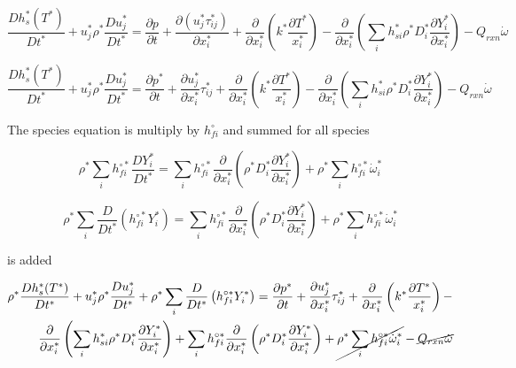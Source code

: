 \begin{equation*}
\frac{D h_{s}^*(T^*)}{D t^*}
+
u_j^*
\rho^*
\frac{D u_j^*}{D t^*}
=
\frac{\partial p}{\partial t} 
+
\frac{\partial (u_j^*\tau_{ij}^*)}{\partial x^*_i}
+
\frac{\partial}{\partial x_i^*}
\left(
    k^*\frac{\partial T^*}{x_i^*}
\right)
-
\frac{\partial}{\partial x_i^*}
\left(
        \sum_i
        h_{si}^*
        \rho^*
        D_i^*
        \frac{\partial Y_i^*}{\partial x_i^*}
\right)
-
Q_{rxn}
\dot{\omega}
\end{equation*} 

\begin{equation*}
\frac{D h_{s}^*(T^*)}{D t^*}
+
u_j^*
\rho^*
\frac{D u_j^*}{D t^*}
=
\frac{\partial p^*}{\partial t} 
+
\frac{\partial u_j^*}{\partial x^*_i}
\tau_{ij}^*
+
\frac{\partial}{\partial x_i^*}
\left(
    k^*\frac{\partial T^*}{x_i^*}
\right)
-
\frac{\partial}{\partial x_i^*}
\left(
        \sum_i
        h_{si}^*
        \rho^*
        D_i^*
        \frac{\partial Y_i^*}{\partial x_i^*}
\right)
-
Q_{rxn}
\dot{\omega}
\end{equation*} 


The species equation is multiply by $h_{fi}^{\circ}$ and summed 
for all species 

\begin{equation}
    \rho^*
    \sum_i  
    h_{fi}^{\circ*}
    \frac{D Y_i^*}{D t^*}
    =
    \sum_i  
    h_{fi}^{\circ*}
    \frac{\partial }{\partial x_i^*}
    \left(
        \rho^*D_i^*
        \frac{\partial Y_i^* }{\partial x_i^*}
    \right)
    +
    \rho^*
    \sum_i
    h_{fi}^{\circ*}
    \dot{\omega}_i^{*}
\end{equation}

\begin{equation}
    \rho^*
    \sum_i  
    \frac{D }{D t^*}
    \left(
        h_{fi}^{\circ*}
        Y_i^*
    \right)
    =
    \sum_i  
    h_{fi}^{\circ*}
    \frac{\partial }{\partial x_i^*}
    \left(
        \rho^*D_i^*
        \frac{\partial Y_i^* }{\partial x_i^*}
    \right)
    +
    \rho^*
    \sum_i
    h_{fi}^{\circ*}
    \dot{\omega}_i^{*}
\end{equation}

is added 

\begin{equation*}
\begin{split}
\rho^*
\frac{D h_{s}^*(T^*)}{D t^*}
+
u_j^*
\rho^*
\frac{D u_j^*}{D t^*}
+
\rho^*
\sum_i  
\frac{D }{D t^*}
\left(
    h_{fi}^{\circ*}
    Y_i^*
\right)
=
\frac{\partial p^*}{\partial t} 
+
\frac{\partial u_j^*}{\partial x^*_i}
\tau_{ij}^*
+
\frac{\partial}{\partial x_i^*}
\left(
    k^*\frac{\partial T^*}{x_i^*}
\right)
-
\\
\frac{\partial}{\partial x_i^*}
\left(
        \sum_i
        h_{si}^*
        \rho^*
        D_i^*
        \frac{\partial Y_i^*}{\partial x_i^*}
\right)
+
\sum_i  
h_{fi}^{\circ*}
\frac{\partial }{\partial x_i^*}
\left(
    \rho^*D_i^*
    \frac{\partial Y_i^* }{\partial x_i^*}
\right)
+
\cancel{
\rho^*
\sum_i
h_{fi}^{\circ*}
\dot{\omega}_i^{*}
}
-
\cancel{
Q_{rxn}
\dot{\omega}
}
\end{split}
\end{equation*} 

